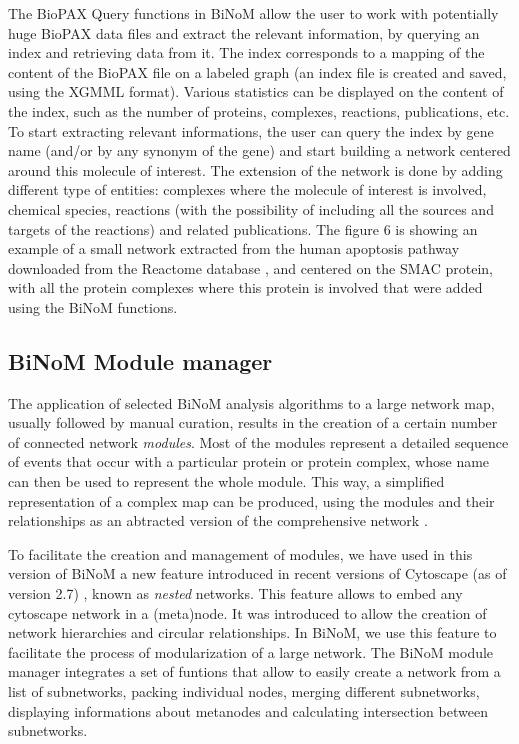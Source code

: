 \documentclass[10pt]{bmc_article}
\newenvironment{bmcformat}{\baselineskip20pt\sloppy\setboolean{publ}{false}}{\baselineskip20pt\sloppy}
\begin{document}
\begin{bmcformat}
The BioPAX Query functions in BiNoM allow the user to work with potentially huge
BioPAX data files and extract the relevant information, by querying an index and
retrieving data from it. The index corresponds to a mapping of the content of
the BioPAX file on a labeled graph (an index file is created and saved, using
the XGMML format). Various statistics can be displayed on the content of the
index, such as the number of proteins, complexes, reactions, publications, etc.
To start extracting relevant informations, the user can query the index by gene
name (and/or by any synonym of the gene) and start building a network centered
around this molecule of interest. The extension of the network is done by adding
different type of entities: complexes where the molecule of interest is
involved, chemical species, reactions (with the possibility of including all the
sources and targets of the reactions) and related publications. The figure 6
is showing an example of a small network extracted from the human apoptosis
pathway downloaded from the Reactome database \cite{joshi2005reactome}, and
centered on the SMAC protein, with all the protein complexes where
this protein is involved that were added using the BiNoM functions.


\subsection*{BiNoM Module manager}
The application of selected BiNoM analysis algorithms to a large network map,
usually followed by manual curation, results in the creation of a certain number
of connected network \emph{modules}. Most of the modules represent a detailed
sequence of events that occur with a particular protein or protein complex,
whose name can then be used to represent the whole module. This way, a
simplified representation of a complex map can be produced, using the modules
and their relationships as an abtracted version of the comprehensive network
\cite{calzone2008comprehensive}.

To facilitate the creation and management of modules, we have used in this
version of BiNoM a new feature introduced in recent versions of Cytoscape (as of
version 2.7) \cite{cline2007integration}, known as \emph{nested} networks. This
feature allows to embed any cytoscape network in a (meta)node. It was
introduced to allow the creation of network hierarchies and circular
relationships. In BiNoM, we use this feature to facilitate the process of
modularization of a large network. The BiNoM module manager integrates a set of
funtions that allow to easily create a network from a list of subnetworks,
packing individual nodes, merging different subnetworks, displaying informations
about metanodes and calculating intersection between subnetworks.


\end{bmcformat}
\end{document}
